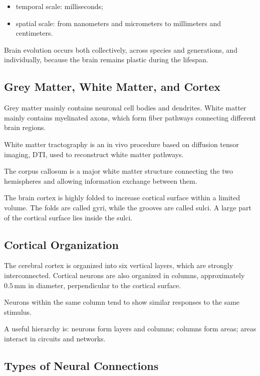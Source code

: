 \begin{itemize}[noitemsep]
    \item temporal scale: milliseconds;
    \item spatial scale: from nanometers and micrometers to millimeters and centimeters.
\end{itemize}

Brain evolution occurs both collectively, across species and generations, and individually, because the brain remains plastic during the lifespan.

\subsection{Grey Matter, White Matter, and Cortex}

Grey matter mainly contains neuronal cell bodies and dendrites. White matter mainly contains myelinated axons, which form fiber pathways connecting different brain regions.

White matter tractography is an in vivo procedure based on diffusion tensor imaging, DTI, used to reconstruct white matter pathways.

The corpus callosum is a major white matter structure connecting the two hemispheres and allowing information exchange between them.

The brain cortex is highly folded to increase cortical surface within a limited volume. The folds are called gyri, while the grooves are called sulci. A large part of the cortical surface lies inside the sulci.

\subsection{Cortical Organization}

The cerebral cortex is organized into six vertical layers, which are strongly interconnected. Cortical neurons are also organized in columns, approximately $0.5\,\text{mm}$ in diameter, perpendicular to the cortical surface.

Neurons within the same column tend to show similar responses to the same stimulus.

\begin{authornote}
A useful hierarchy is: neurons form layers and columns; columns form areas; areas interact in circuits and networks.
\end{authornote}

\subsection{Types of Neural Connections}

